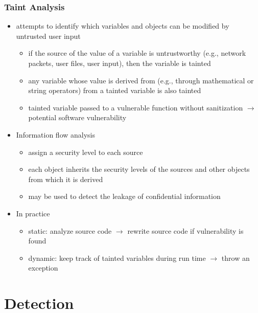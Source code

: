 \documentclass[final]{article}
\begin{document}
\subsubsection*{Taint Analysis}
\begin{itemize}[nosep]
    \item attempts to identify which variables and objects can be modified by untrusted user input
          \begin{itemize}[nosep]
              \item if the source of the value of a variable is untrustworthy (e.g., network packets, user files, user input), then the variable is tainted
              \item any variable whose value is derived from (e.g., through mathematical or string operators) from a tainted variable is also tainted
              \item tainted variable passed to a vulnerable function without sanitization $\rightarrow$ potential software vulnerability
          \end{itemize}
    \item Information flow analysis
          \begin{itemize}[nosep]
              \item assign a security level to each source
              \item each object inherits the security levels of the sources and other objects from which it is derived
              \item may be used to detect the leakage of confidential information
          \end{itemize}
    \item In practice
          \begin{itemize}[nosep]
              \item static: analyze source code $\rightarrow$ rewrite source code if vulnerability is found
              \item dynamic: keep track of tainted variables during run time $\rightarrow$ throw an exception
          \end{itemize}
\end{itemize}
\section{Detection}
\end{document}
